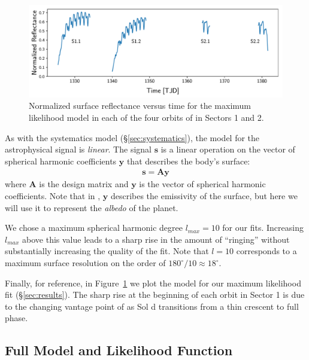 \documentclass[modern]{aastex62}
\begin{document}
\begin{figure}[t!]
    \begin{centering}
    \includegraphics[width=\linewidth]{figures/starry_model.pdf}
    \caption{\label{fig:starry_model}
             Normalized surface reflectance versus time for the maximum
             likelihood \starry model in each of the four orbits of \TESS
             in Sectors 1 and 2.
             }
    \end{centering}
\end{figure}

As with the systematics model (\S\ref{sec:systematics}), the model
for the astrophysical signal is \emph{linear}. The signal $\mathbf{s}$ 
is a linear operation on the vector of spherical harmonic coefficients 
$\mathbf{y}$
that describes the body's surface:
%
\begin{align}
    \mathbf{s} = \mathbf{A} \mathbf{y}
\end{align}
%
where $\mathbf{A}$ is the design matrix and $\mathbf{y}$ is the vector of spherical harmonic coefficients. 
Note that in \cite{Luger2019}, $\mathbf{y}$ describes the emissivity of the surface,
but here we will use it to represent the \emph{albedo} of the planet.

We chose a maximum spherical harmonic degree $l_{max} = 10$ for our fits.
Increasing $l_{max}$ above this value 
leads to a sharp rise in the amount of ``ringing'' without substantially
increasing the quality of the fit. Note that $l = 10$ corresponds to
a maximum surface resolution on the order of $180^\circ/10 \approx 18^\circ$.

Finally, for reference, in Figure~\ref{fig:starry_model} we plot the
\starry model for our maximum likelihood fit (\S\ref{sec:results}). The
sharp rise at the beginning of each orbit in Sector 1 is due to the changing
vantage point of \TESS as Sol d transitions from a thin crescent to full phase.

\subsection{Full Model and Likelihood Function}
\label{sec:model}
\end{document}
